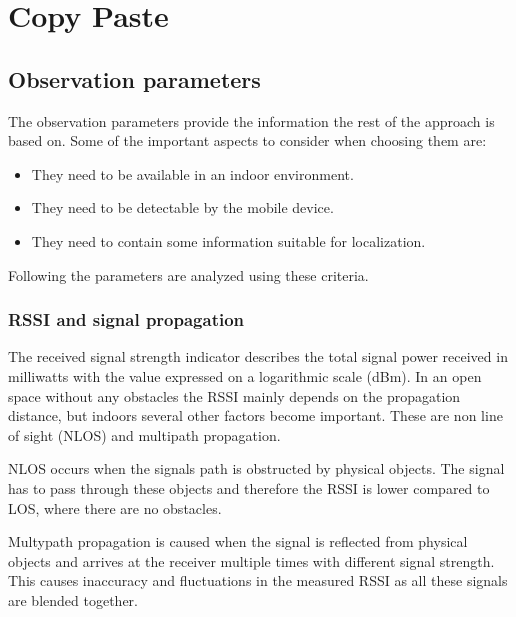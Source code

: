 \chapter{Copy Paste}

\section{Observation parameters}

The observation parameters provide the information the rest of the approach is based on. Some of the important aspects to consider when choosing them are:
\begin{itemize}
\item They need to be available in an indoor environment.
\item They need to be detectable by the mobile device.
\item They need to contain some information suitable for localization.
\end{itemize}
Following the parameters are analyzed using these criteria.
\\
\subsection{RSSI and signal propagation}

The received signal strength indicator describes the total signal power received in milliwatts with the value expressed on a logarithmic scale (dBm)\cite[p.~160]{sauter2010gsm}.   In an open space without any obstacles the RSSI mainly depends on the propagation distance, but indoors several other factors become important. These are non line of sight (NLOS) and multipath propagation.

NLOS occurs when the signals path is obstructed by physical objects. The signal has to pass through these objects and therefore the RSSI is lower compared to LOS, where there are no obstacles\cite{JoseMaster}.

Multypath propagation is caused when the signal is reflected from physical objects and arrives at the receiver multiple times with different signal strength. This causes inaccuracy and fluctuations in the measured RSSI as all these signals are blended together\cite{multipathEffects}.

